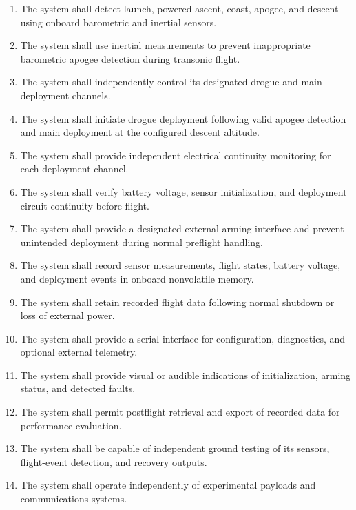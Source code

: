 \begin{enumerate}

    \item The system shall detect launch, powered
    ascent, coast, apogee, and descent using
    onboard barometric and inertial sensors.

    \item The system shall use inertial measurements
    to prevent inappropriate barometric
    apogee detection during transonic flight.

    \item The system shall independently control
    its designated drogue and main
    deployment channels.

    \item The system shall initiate drogue
    deployment following valid apogee detection
    and main deployment at the configured
    descent altitude.

    \item The system shall provide independent
    electrical continuity monitoring for
    each deployment channel.

    \item The system shall verify battery voltage,
    sensor initialization, and deployment
    circuit continuity before flight.

    \item The system shall provide a designated
    external arming interface and prevent
    unintended deployment during normal
    preflight handling.

    \item The system shall record sensor
    measurements, flight states, battery
    voltage, and deployment events in
    onboard nonvolatile memory.

    \item The system shall retain recorded
    flight data following normal shutdown
    or loss of external power.

    \item The system shall provide a serial
    interface for configuration, diagnostics,
    and optional external telemetry.

    \item The system shall provide visual
    or audible indications of initialization,
    arming status, and detected faults.

    \item The system shall permit postflight
    retrieval and export of recorded data
    for performance evaluation.

    \item The system shall be capable of
    independent ground testing of its
    sensors, flight-event detection,
    and recovery outputs.

    \item The system shall operate independently
    of experimental payloads and
    communications systems.

\end{enumerate}
